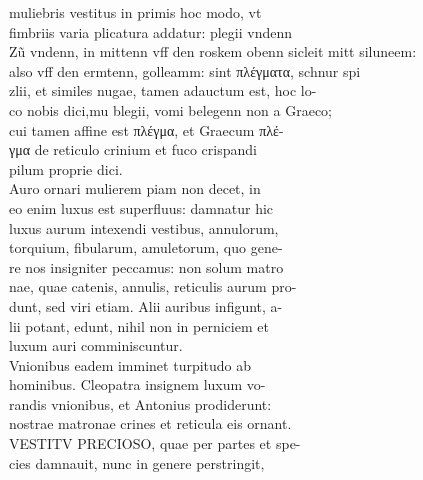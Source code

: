 \documentclass{article}
\begin{document}
\begin{pages}
                muliebris vestitus in primis hoc modo, vt \\
                fimbriis varia plicatura addatur: plegii vndenn \\
                Zũ vndenn, in mittenn vff den roskem obenn sicleit mitt siluneem: \\
                also vff den ermtenn, golleamm: sint πλέγματα, schnur spi \\
                zlii, et similes nugae, tamen adauctum est, hoc lo- \\
                co nobis dici,mu blegii, vomi belegenn non a Graeco; \\
                cui tamen affine est πλέγμα, et Graecum πλέ- \\
                γμα de reticulo crinium et fuco crispandi \\
                pilum proprie dici. \\
                Auro ornari mulierem piam non decet, in \\
                eo enim luxus est superfluus: damnatur hic \\
                luxus aurum intexendi vestibus, annulorum, \\
                torquium, fibularum, amuletorum, quo gene- \\
                re nos insigniter peccamus: non solum matro \\
                nae, quae catenis, annulis, reticulis aurum pro- \\
                dunt, sed viri etiam. Alii auribus infigunt, a- \\
                lii potant, edunt, nihil non in perniciem et \\
                luxum auri comminiscuntur. \\
                Vnionibus eadem imminet turpitudo ab \\
                hominibus. Cleopatra insignem luxum vo- \\
                randis vnionibus, et Antonius prodiderunt: \\
                nostrae matronae crines et reticula eis ornant. \\
                VESTITV PRECIOSO, quae per partes et spe- \\
                cies damnauit, nunc in genere perstringit, \\

\end{pages}
\end{document}
